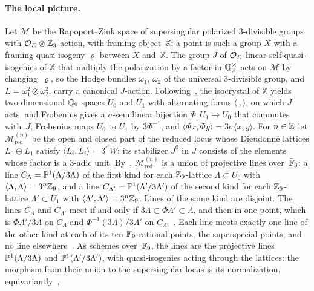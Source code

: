 \paragraph{The local picture.} Let $\mathcal M$ be the Rapoport--Zink space of supersingular polarized $3$-divisible
groups with $\mathcal{O}_E\otimes\mathbb{Z}_3$-action, with framing object~$\mathbb X$: a point is such a group $X$ with a framing
quasi-isogeny $\varrho$ between $X$ and~$\mathbb X$. The group $J$ of $\mathcal{O}_E$-linear self-quasi-isogenies of $\mathbb X$
that multiply the polarization by a factor in $\mathbb{Q}_3^\times$ acts on $\mathcal M$ by changing~$\varrho$, so the Hodge bundles
$\omega_1$, $\omega_2$ of the universal $3$-divisible group, and $L=\omega_1^2\otimes\omega_2^2$, carry a canonical
$J$-action. Following~\cite[Section~4]{KudlaRapoport1999}, the isocrystal of $\mathbb X$ yields two-dimensional
$\mathbb{Q}_9$-spaces $U_0$ and $U_1$ with alternating forms $\langle\,,\rangle$, on which $J$ acts, and Frobenius gives a
$\sigma$-semilinear bijection $\Phi\colon U_1\to U_0$ that commutes with~$J$; Frobenius maps $U_0$ to $U_1$ by
$3\Phi^{-1}$, and $\langle\Phi x,\Phi y\rangle=3\sigma\langle x,y\rangle$. For $n\in\mathbb{Z}$ let $\mathcal M^{(n)}_{\mathrm{red}}$ be the
open and closed part of the reduced locus whose Dieudonn\'e lattices $L_0\oplus L_1$ satisfy $\langle L_i,L_i\rangle=3^nW$;
its stabilizer $J^0$ in $J$ consists of the elements whose factor is a $3$-adic unit.
By~\cite[Lemma~4.3 and Proposition~4.4]{KudlaRapoport1999}, $\mathcal M^{(n)}_{\mathrm{red}}$ is a union of projective lines
over~$\bar{\mathbb{F}}_3$: a line $C_\Lambda=\mathbb{P}^1(\Lambda/3\Lambda)$ of
the first kind for each $\mathbb{Z}_9$-lattice $\Lambda\subset U_0$ with $\langle\Lambda,\Lambda\rangle=3^n\mathbb{Z}_9$, and a line
$C_{\Lambda'}=\mathbb{P}^1(\Lambda'/3\Lambda')$ of the second kind for each $\mathbb{Z}_9$-lattice $\Lambda'\subset U_1$ with
$\langle\Lambda',\Lambda'\rangle=3^n\mathbb{Z}_9$. Lines of the same kind are disjoint. The lines $C_\Lambda$ and $C_{\Lambda'}$ meet
if and only if $3\Lambda\subset\Phi\Lambda'\subset\Lambda$, and then in one point, which is $\Phi\Lambda'/3\Lambda$ on
$C_\Lambda$ and $\Phi^{-1}(3\Lambda)/3\Lambda'$ on $C_{\Lambda'}$~\cite[Lemma~4.3(ii)]{KudlaRapoport1999}. Each line meets
exactly one line of the other kind at each of its ten $\mathbb{F}_9$-rational points, the superspecial points, and no line
elsewhere~\cite[Lemma~4.3(iii) and the text after~(4.9)]{KudlaRapoport1999}. As schemes over~$\mathbb{F}_9$, the lines are the
projective lines $\mathbb{P}^1(\Lambda/3\Lambda)$ and $\mathbb{P}^1(\Lambda'/3\Lambda')$, with quasi-isogenies acting through the lattices:
the morphism from their union to the supersingular locus is its normalization, equivariantly~\cite[(4.10)]{KudlaRapoport1999},
